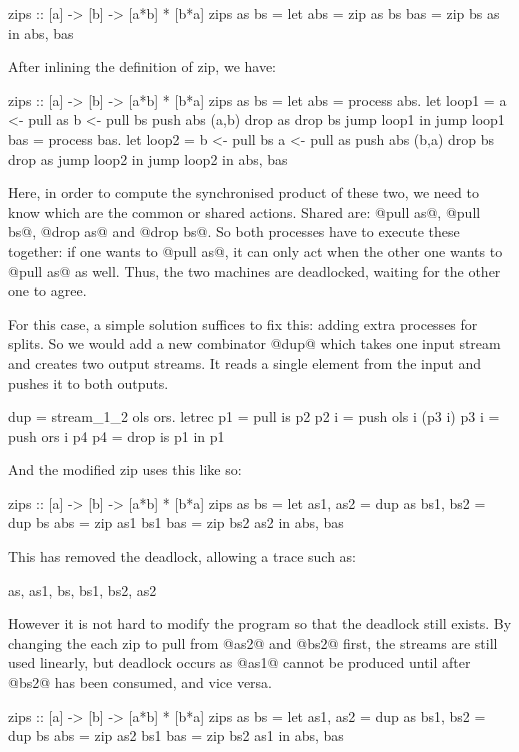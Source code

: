 \begin{code}
zips :: [a] -> [b] -> [a*b] * [b*a]
zips as bs =
  let abs = zip as bs
      bas = zip bs as
  in  abs, bas
\end{code}

After inlining the definition of zip, we have:
\begin{code}
zips :: [a] -> [b] -> [a*b] * [b*a]
zips as bs =
  let abs = process abs.
       let loop1 =
          a <- pull as
          b <- pull bs
          push abs (a,b)
          drop as
          drop bs
          jump loop1
       in jump loop1
      bas = process bas.
       let loop2 =
          b <- pull bs
          a <- pull as
          push abs (b,a)
          drop bs
          drop as
          jump loop2
       in jump loop2
  in  abs, bas
\end{code}

Here, in order to compute the synchronised product of these two, we need to know which are the common or shared actions.
Shared are: @pull as@, @pull bs@, @drop as@ and @drop bs@.
So both processes have to execute these together: if one wants to @pull as@, it can only act when the other one wants to @pull as@ as well.
Thus, the two machines are deadlocked, waiting for the other one to agree.

For this case, a simple solution suffices to fix this: adding extra processes for splits. So we would add a new combinator @dup@ which takes one input stream and creates two output streams. It reads a single element from the input and pushes it to both outputs.

\begin{code}
dup = stream_1_2 \is ols ors.
  letrec
    p1   = pull is p2
    p2 i = push ols i (p3 i)
    p3 i = push ors i p4
    p4   = drop is p1
  in p1
\end{code}
And the modified zip uses this like so:

\begin{code}
zips :: [a] -> [b] -> [a*b] * [b*a]
zips as bs =
  let as1, as2 = dup as
      bs1, bs2 = dup bs
      abs = zip as1 bs1
      bas = zip bs2 as2
  in  abs, bas
\end{code}

This has removed the deadlock, allowing a trace such as:
\begin{code}
as, as1, bs, bs1, bs2, as2
\end{code}

However it is not hard to modify the program so that the deadlock still exists.
By changing the each zip to pull from @as2@ and @bs2@ first, the streams are still used linearly, but deadlock occurs as @as1@ cannot be produced until after @bs2@ has been consumed, and vice versa.
\begin{code}
zips :: [a] -> [b] -> [a*b] * [b*a]
zips as bs =
  let as1, as2 = dup as
      bs1, bs2 = dup bs
      abs = zip as2 bs1
      bas = zip bs2 as1
  in  abs, bas
\end{code}

